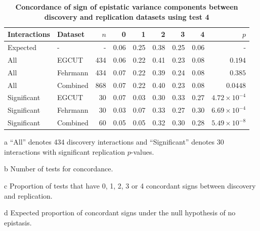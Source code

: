 \documentclass{article}
\begin{document}
\begin{table}[ht]
\begin{threeparttable}
\caption{\textbf{Concordance of sign of epistatic variance components between discovery and replication datasets using test 4}}
\label{tab:sign2}
\begin{tabular}{llrrrrrrr}
\hline
Interactions\tnote{a} & Dataset & $n$\tnote{b} & 0\tnote{c} & 1\tnote{c} & 2\tnote{c} & 3\tnote{c} & 4\tnote{c} & $p$ \\
\hline
Expected\tnote{d} & - & - & 0.06 & 0.25 & 0.38 & 0.25 & 0.06 & - \\
All & EGCUT & 434 & 0.06 & 0.22 & 0.41 & 0.23 & 0.08 & $0.194$ \\
All & Fehrmann & 434 & 0.07 & 0.22 & 0.39 & 0.24 & 0.08 & $0.385$ \\
All & Combined & 868 & 0.07 & 0.22 & 0.40 & 0.23 & 0.08 & $0.0448$ \\
Significant & EGCUT & 30 & 0.07 & 0.03 & 0.30 & 0.33 & 0.27 & $4.72 \times 10^{-4}$ \\
Significant & Fehrmann & 30 & 0.03 & 0.07 & 0.33 & 0.27 & 0.30 & $6.69 \times 10^{-4}$ \\
Significant & Combined & 60 & 0.05 & 0.05 & 0.32 & 0.30 & 0.28 & $5.49 \times 10^{-8}$ \\
\hline\end{tabular}

\begin{tablenotes}
\item[a] ``All'' denotes 434 discovery interactions and ``Significant'' denotes 30 interactions with significant replication $p$-values.
\item[b] Number of tests for concordance.
\item[c] Proportion of tests that have 0, 1, 2, 3 or 4 concordant signs between discovery and replication.
\item[d] Expected proportion of concordant signs under the null hypothesis of no epistasis.
\end{tablenotes}

\end{threeparttable}
\end{table}
\end{document}
